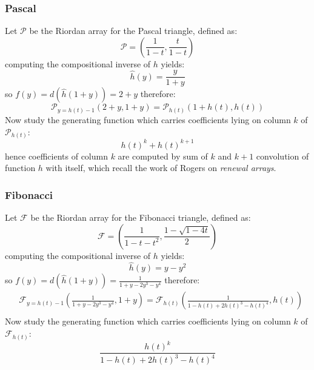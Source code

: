 \subsubsection{Pascal}
Let $\mathcal{P}$ be the Riordan array for the Pascal triangle,
defined as:
\begin{displaymath} 
    \mathcal{P} = \left(\frac{1}{1-t}, \frac{t}{1-t}  \right)
\end{displaymath} 
computing the compositional inverse of $h$ yields:
\begin{displaymath} 
    \hat{h}(y) = \frac{y}{1+y}
\end{displaymath} 
so $f(y)=d(\hat{h}(1+y))=2+y$ therefore:
\begin{displaymath} 
    \mathcal{P}_{y=h(t)-1}\left( 2+y, 1+y \right)= \mathcal{P}_{h(t)}\left( 1+h(t), h(t) \right)
\end{displaymath} 
Now study the generating function which carries coefficients lying on column $k$
of $\mathcal{P}_{h(t)}$:
\begin{displaymath} 
    h(t)^k + h(t)^{k+1}
\end{displaymath} 
hence coefficients of column $k$ are computed by sum of $k$ and $k+1$ convolution 
of function $h$ with itself, which recall the work of Rogers on \emph{renewal arrays}.

\subsubsection{Fibonacci}
Let $\mathcal{F}$ be the Riordan array for the Fibonacci triangle,
defined as:
\begin{displaymath} 
    \mathcal{F} = \left(\frac{1}{1-t-t^2}, \frac{1-\sqrt{1-4t}}{2}  \right)
\end{displaymath} 
computing the compositional inverse of $h$ yields:
\begin{displaymath} 
    \hat{h}(y) = y - y^2
\end{displaymath} 
so $f(y)=d(\hat{h}(1+y))=\frac{1}{1+y-2y^3-y^4}$ therefore:
\begin{displaymath} 
    \begin{split} 
        & \mathcal{F}_{y=h(t)-1}\left( \frac{1}{1+y-2y^3-y^4}, 1+y \right) = \mathcal{F}_{h(t)}\left( \frac{1}{1-h(t)+2h(t)^3-h(t)^4}, h(t) \right)\\
    \end{split} 
\end{displaymath} 
Now study the generating function which carries coefficients lying on column $k$
of $\mathcal{F}_{h(t)}$:
\begin{displaymath} 
    \frac{h(t)^k}{1-h(t)+2h(t)^3-h(t)^4}
\end{displaymath} 

